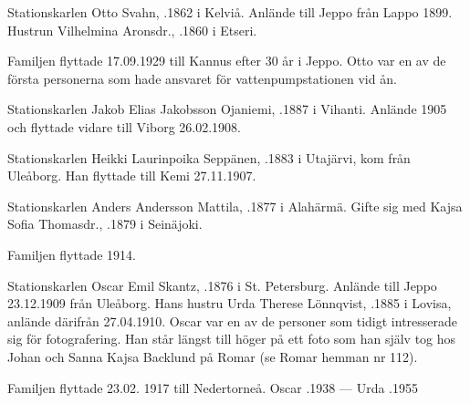 Stationskarlen Otto Svahn, .1862 i Kelviå. Anlände till Jeppo från Lappo 1899. Hustrun Vilhelmina Aronsdr., .1860 i Etseri.
\begin{jhchildren}
  \item {}
  \item {}
  \item {}
  \item {}
  \item {}
  \item {}
  \item {}
  \item {}
  \item {}
  \item {}
  \item {}
\end{jhchildren}
Familjen flyttade 17.09.1929 till Kannus efter 30 år i Jeppo. Otto var en av de första personerna som hade ansvaret för vattenpumpstationen vid ån.


Stationskarlen Jakob Elias Jakobsson Ojaniemi, .1887 i Vihanti. Anlände 1905 och flyttade vidare till Viborg 26.02.1908.


Stationskarlen Heikki Laurinpoika Seppänen, .1883 i Utajärvi, kom från Uleåborg. Han flyttade till Kemi 27.11.1907.


Stationskarlen Anders Andersson Mattila, .1877 i Alahärmä. Gifte sig med Kajsa Sofia Thomasdr., .1879 i Seinäjoki.
\begin{jhchildren}
  \item {}
  \item {}
\end{jhchildren}
Familjen flyttade 1914.


Stationskarlen Oscar Emil Skantz, .1876 i St. Petersburg. Anlände till Jeppo 23.12.1909 från Uleåborg. Hans hustru Urda Therese Lönnqvist, .1885 i Lovisa, anlände därifrån 27.04.1910. Oscar var en av de personer som tidigt intresserade sig för fotografering. Han står längst till höger på ett foto som han själv tog hos Johan och Sanna Kajsa Backlund på Romar (se Romar hemman nr 112).
\begin{jhchildren}
  \item {}
  \item {}
  \item {}
\end{jhchildren}
Familjen flyttade 23.02. 1917 till Nedertorneå. Oscar .1938 ---  Urda .1955


